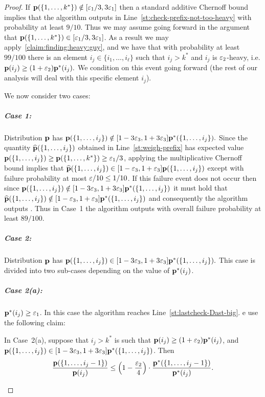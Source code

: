 \begin{proof}
If $\mathbf{p}(\{1,\dots,k^\ast\}) \notin [{\varepsilon_1}/3, 3 {\varepsilon_1}]$ then a standard additive Chernoff bound implies that the algorithm
outputs \reject in Line~\ref{st:check-prefix-not-too-heavy} with probability at least $9/10.$
Thus we may assume going forward in the argument that $\mathbf{p}(\{1,\dots,k^\ast\}) \in [{\varepsilon_1}/3, 3 {\varepsilon_1}]$.
As a result we may apply~\cref{claim:finding:heavy:guy}, and we have that with probability
at least $99/100$ there is an element $i_j \in \{i_1,\dots,i_\ell\}$ such that
$i_j > k^\ast$ and $i_j$ is ${\varepsilon_2}$-heavy,
i.e. $\mathbf{p}(i_j) \geq (1+{\varepsilon_2})\mathbf{p}^\ast(i_j).$  We condition on this event going forward (the rest of our
analysis will deal with this specific element $i_j$).

 We now consider two cases:

\subparagraph{Case 1:}  Distribution $\mathbf{p}$ has $\mathbf{p}(\{1,\dots,i_j\}) \notin
[1-3{\varepsilon_3},1+3{\varepsilon_3}]\mathbf{p}^\ast(\{1,\dots,i_j\}).$  Since the quantity $\widehat{\mathbf{p}}(\{1,\dots,i_j\})$ obtained in Line~\ref{st:weigh-prefix}
has expected value 
$\D(\{1,\dots,i_j\}) \geq \D(\{1,\dots,k^\ast\}) \geq {\eps_1}/3$,
{applying the}
multiplicative Chernoff bound implies that
$\widehat{\mathbf{p}}(\{1,\dots,i_j\}) \in [1-{\varepsilon_3},1+{\varepsilon_3}]\mathbf{p}(\{1,\dots,i_j\})$
except with failure probability at most $\varepsilon/10 \leq 1/10$.  If this failure event does not occur
then since $\mathbf{p}(\{1,\dots,i_j\}) \notin
[1-3{\varepsilon_3},1+3{\varepsilon_3}]\mathbf{p}^\ast(\{1,\dots,i_j\})$ it must hold that $
\widehat{\mathbf{p}}(\{1,\dots,i_j\}) \notin [1-{\varepsilon_3},1+{\varepsilon_3}]\mathbf{p}^\ast(\{1,\dots,i_j\})$ and consequently
the algorithm outputs \reject.  Thus in Case~1 the algorithm outputs \reject with overall failure
probability at least $89/100.$

\subparagraph{Case 2:} Distribution $\mathbf{p}$ has $\mathbf{p}(\{1,\dots,i_j\}) \in
[1-3{\varepsilon_3},1+3{\varepsilon_3}]\mathbf{p}^\ast(\{1,\dots,i_j\}).$  This case is divided into two sub-cases depending
on the value of $\mathbf{p}^\ast(i_j)$.

\subparagraph{Case 2(a):}  $\D^\ast(i_j) \geq {\eps_1}$.
In this case the algorithm reaches Line~\ref{st:lastcheck-Dast-big}. e
use the following {claim}:
\begin{claim} \label{clm:truth-will-out-1}
In Case~2(a), suppose that
$i_j > k^\ast$ is such that $\mathbf{p}(i_j) \geq (1+{\varepsilon_2})\mathbf{p}^\ast(i_j)$, and
$\mathbf{p}(\{1,\dots,i_j\}) \in
[1-3{\varepsilon_3},1+3{\varepsilon_3}]\mathbf{p}^\ast(\{1,\dots,i_j\})$.
Then
\[
\frac {\mathbf{p}(\{1,\dots,i_j-1\})}{\mathbf{p}(i_j)} \leq
\left(
1 - {\frac {{\varepsilon_2}} 4}
\right)
\cdot
{\frac {\ensuremath{\mathbf{p}}^\ast(\{1,\dots,i_j-1\})}{\ensuremath{\mathbf{p}}^\ast(i_j)}}.
\]
\end{claim}


\end{proof}
